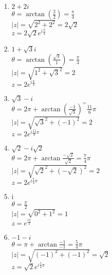 \documentclass[twoside]{book}
\begin{document}
\begin{sol}
    \begin{solucion}{}
        \phantom{a}
        \begin{multicols}{2}
            \begin{enumerate}
                \item $2+2i$\\ $\theta=\arctan(\frac{2}{2})=\frac{\pi}{4}$\\
                      $|z|=\sqrt{2^2+2^2}=2\sqrt{2}$\\
                      $z=2\sqrt{2}e^{i\frac{\pi}{4}}$
                \item $1+\sqrt{3}i$\\
                      $\theta=\arctan(\frac{\sqrt{3}}{1})=\frac{\pi}{3}$\\
                      $|z|=\sqrt{1^2+\sqrt{3}^2}=2$\\
                      $z=2e^{i\frac{\pi}{3}}$
                \item $\sqrt{3}-i$\\
                      $\theta=2\pi+\arctan(\frac{-1}{\sqrt{3}})^=\frac{11}{6}\pi$\\
                      $|z|=\sqrt{\sqrt{3}^2+(-1)^2}=2$\\
                      $z=2e^{i\frac{11}{6}\pi}$
                \item $\sqrt{2}-i\sqrt{2}$\\
                      $\theta=2\pi+\arctan{\frac{-\sqrt{2}}{\sqrt{2}}}=\frac{7}{4}\pi$\\
                      $|z|=\sqrt{\sqrt{2}^2+(-\sqrt{2})^2}=2$\\
                      $z=2e^{i\frac{7}{4}\pi}$
                \item i\\
                      $\theta=\frac{\pi}{2}$\\
                      $|z|=\sqrt{0^2+1^2}=1$\\
                      $z=e^{\frac{i\pi}{2}}$
                \item $-1-i$\\
                      $\theta=\pi+\arctan{\frac{-1}{-1}}=\frac{5}{4}\pi$\\
                      $|z|=\sqrt{(-1)^2+(-1)^2}=\sqrt{2}$\\
                      $z=\sqrt{2}e^{i\frac{5}{4}\pi}$
            \end{enumerate}
        \end{multicols}

    \end{solucion}
\end{sol}
\end{document}
